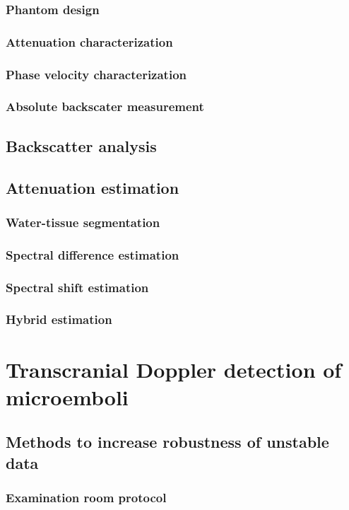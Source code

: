 \documentclass[12pt,twoside]{withesis}
\begin{document}
\subsection{Phantom design}
\subsection{Attenuation characterization}
\subsection{Phase velocity characterization}
\subsection{Absolute backscater measurement}

\section{Backscatter analysis}

\section{Attenuation estimation}
\subsection{Water-tissue segmentation}
\subsection{Spectral difference estimation}
\subsection{Spectral shift estimation}
\subsection{Hybrid estimation}


\chapter{Transcranial Doppler detection of microemboli}

\section{Methods to increase robustness of unstable data}
\subsection{Examination room protocol}
\end{document}
